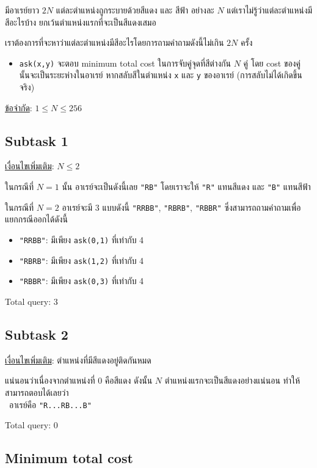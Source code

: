 \documentclass[12pt]{article}
\newcommand{\code}[1]{\texttt{\scriptsize{#1}}}
\begin{document}
มีอาเรย์ยาว $2N$ แต่ละตำแหน่งถูกระบายด้วยสีแดง และ สีฟ้า อย่างละ $N$ แต่เราไม่รู้ว่าแต่ละตำแหน่งมีสีอะไรบ้าง ยกเว้นตำแหน่งแรกที่จะเป็นสีแดงเสมอ 

เราต้องการที่จะหาว่าแต่ละตำแหน่งมีสีอะไรโดยการถามคำถามดังนี้ไม่เกิน $2N$ ครั้ง

\begin{itemize}
  \item \code{ask(x,y)} จะตอบ minimum total cost ในการจับคู่จุดที่สีต่างกัน $N$ คู่ โดย cost ของคู่ นั้นจะเป็นระยะห่างในอาเรย์ หากสลับสีในตำแหน่ง \code{x} และ \code{y} ของอาเรย์ (การสลับไม่ได้เกิดขึ้นจริง)
\end{itemize}

\underline{ข้อจำกัด}: $1 \leq N \leq 256$

\subsection{Subtask 1}

\underline{เงื่อนไขเพิ่มเติม}: $N \leq 2$

ในกรณีที่ $N = 1$ นั้น อาเรย์จะเป็นดังนี้เลย \code{"RB"} โดยเราจะให้ \code{"R"} แทนสีแดง และ \code{"B"} แทนสีฟ้า

ในกรณีที่ $N = 2$ อาเรย์จะมี 3 แบบดังนี้ \code{"RRBB"}, \code{"RBRB"}, \code{"RBBR"} ซึ่งสามารถถามคำถามเพื่อแยกกรณีออกได้ดังนี้

\begin{itemize}
  \item \code{"RRBB"}: มีเพียง \code{ask(0,1)} ที่เท่ากับ 4
  \item \code{"RBRB"}: มีเพียง \code{ask(1,2)} ที่เท่ากับ 4
  \item \code{"RBBR"}: มีเพียง \code{ask(0,3)} ที่เท่ากับ 4
\end{itemize}

Total query: $3$

\subsection{Subtask 2}

\underline{เงื่อนไขเพิ่มเติม}: ตำแหน่งที่มีสีแดงอยู่ติดกันหมด

แน่นอนว่าเนื่องจากตำแหน่งที่ 0 คือสีแดง ดังนั้น $N$ ตำแหน่งแรกจะเป็นสีแดงอย่างแน่นอน ทำให้สามารถตอบได้เลยว่า\\\ อาเรย์คือ \code{"R...RB...B"}

Total query: $0$

\newpage
\subsection{Minimum total cost}
\end{document}
